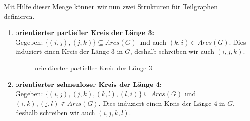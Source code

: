 \noindent Mit Hilfe dieser Menge können wir nun zwei Strukturen für Teilgraphen definieren. 

\begin{definition} \label{Subgraphs}
\begin{enumerate}
	\item \textbf{orientierter partieller Kreis der Länge 3:} \\
	Gegeben: $\{(i,j),(j,k)\} \subseteq Arcs(G)$ und auch $(k,i) \in Arcs(G)$. Dies induziert einen Kreis der Länge 3 in $G$, deshalb schreiben wir auch $(i,j,k)$.
	\begin{figure}[htp]
\begin{center}
\caption[orientierter partieller Kreis der Länge 3]{orientierter partieller Kreis der Länge 3}
  \label{oDreieck}
\end{center}
\end{figure}
	\item \textbf{orientierter sehnenloser Kreis der Länge 4:} \\
	Gegeben: $\{(i,j),(j,k),(k,l),(l,i)\} \subseteq Arcs(G)$ und $(i,k),(j,l) \notin Arcs(G)$. Dies induziert einen Kreis der Länge 4 in $G$, deshalb schreiben wir auch $(i,j,k,l)$. 
	\begin{figure}[htp]
\begin{center}
\end{center}
\end{figure}
\end{enumerate}
\end{definition}
